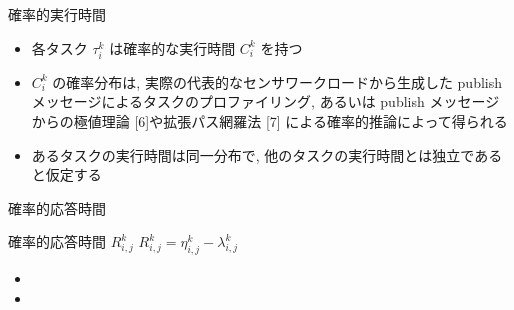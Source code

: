 \begin{frame}{確率的実行時間}
    \begin{itemize}
        \item 各タスク $\tau_{i}^{k}$ は確率的な実行時間 $C_{i}^{k}$ を持つ
        \item $C_{i}^{k}$ の確率分布は, 実際の代表的なセンサワークロードから生成した publish メッセージによるタスクのプロファイリング, あるいは publish メッセージからの極値理論 [6]や拡張パス網羅法 [7] による確率的推論によって得られる
        \item あるタスクの実行時間は同一分布で, 他のタスクの実行時間とは独立であると仮定する
    \end{itemize}
\end{frame}

\begin{frame}{確率的応答時間}
    \begin{block}{確率的応答時間 $R_{i, j}^{k}$}
        $R_{i, j}^{k} = \eta_{i, j}^{k}-\lambda_{i, j}^{k}$
        \setlength{\linewidth}{0.98\columnwidth}
        \begin{itemize}
            \item {}
            \item {}
        \end{itemize}
    \end{block}
\end{frame}


